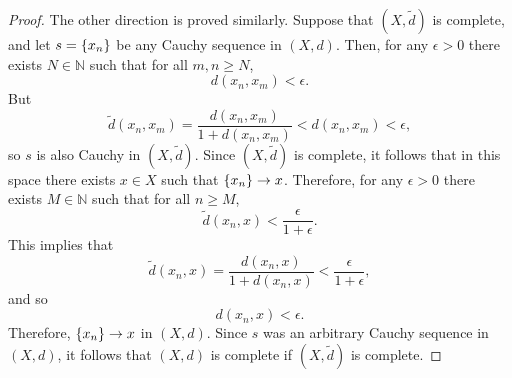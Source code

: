 \documentclass{article}
\newcommand{\N}{\mathbb{N}}
\begin{document}
\begin{proof}
The other direction is proved similarly. Suppose that $(X, \tilde{d})$
is complete, and let $s = \cbr{x_n}$ be any Cauchy sequence in $(X, d)$.
Then, for any $\epsilon > 0$ there exists $N \in \N$ such that for all
$m, n \geq N$,
%
\begin{equation*}
    d(x_n, x_m) < \epsilon
    .
\end{equation*}
%
But
%
\begin{equation*}
    \tilde{d}(x_n, x_m)
        = \frac{d(x_n, x_m)}{1 + d(x_n, x_m)} < d(x_n, x_m) < \epsilon
    ,
\end{equation*}
%
so $s$ is also Cauchy in $(X, \tilde{d})$. Since $(X, \tilde{d})$ is
complete, it follows that in this space there exists $x \in X$ such that
$\cbr{x_n} \to x$. Therefore, for any $\epsilon > 0$ there exists $M \in \N$
such that for all $n \geq M$,
%
\begin{equation*}
    \tilde{d}(x_n, x) < \frac{\epsilon}{1 + \epsilon}
    .
\end{equation*}
%
This implies that
%
\begin{equation*}
    \tilde{d}(x_n, x)
        = \frac{d(x_n, x)}{1 + d(x_n, x)}
        < \frac{\epsilon}{1 + \epsilon}
        ,
\end{equation*}
%
and so
%
\begin{equation*}
    d(x_n, x) < \epsilon
    .
\end{equation*}
%
Therefore, $\cbr{x_n} \to x$ in $(X, d)$. Since $s$ was an arbitrary
Cauchy sequence in $(X, d)$, it follows that $(X, d)$ is complete if
$(X, \tilde{d})$ is complete.

\end{proof}
\end{document}
